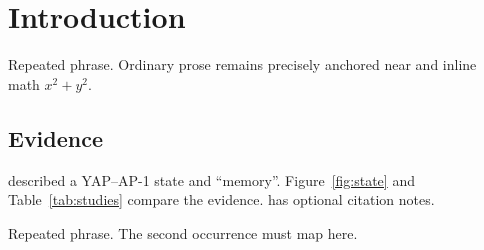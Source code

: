 \section{Introduction}
Repeated phrase. Ordinary prose remains precisely anchored near
\parencite{reader2025} and inline math $x^2 + y^2$.

\subsection{Evidence}
\textcite{reader2025} described a YAP--AP-1 state and ``memory''.
Figure~\ref{fig:state} and Table~\ref{tab:studies} compare the evidence.
\parencite[see][p. 3]{reader2025} has optional citation notes.

Repeated phrase. The second occurrence must map here.
